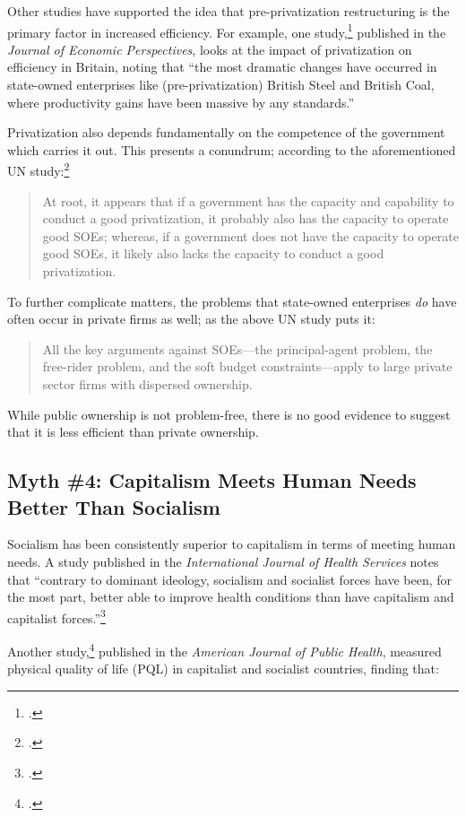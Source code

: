 Other studies have supported the idea that pre-privatization restructuring is the primary factor in increased efficiency.
For example, one study,\footcite{vickers-privatization} published in the \textit{Journal of Economic Perspectives}, looks at the impact of privatization on efficiency in Britain, noting that ``the most dramatic changes have occurred in state-owned enterprises like (pre-privatization) British Steel and British Coal, where productivity gains have been massive by any standards.''

Privatization also depends fundamentally on the competence of the government which carries it out.
This presents a conundrum; according to the aforementioned UN study:\footcite{ha-joon}
\begin{quote}
At root, it appears that if a government has the capacity and capability to conduct a good privatization, it probably also has the capacity to operate good SOEs; whereas, if a government does not have the capacity to operate good SOEs, it likely also lacks the capacity to conduct a good privatization.
\end{quote}
To further complicate matters, the problems that state-owned enterprises \emph{do} have often occur in private firms as well; as the above UN study puts it:
\begin{quote}
All the key arguments against SOEs---the principal-agent problem, the free-rider problem, and the soft budget constraints---apply to large private sector firms with dispersed ownership.
\end{quote}
While public ownership is not problem-free, there is no good evidence to suggest that it is less efficient than private ownership.

\subsection*{Myth \#4: Capitalism Meets Human Needs Better Than Socialism}

Socialism has been consistently superior to capitalism in terms of meeting human needs.
A study published in the \textit{International Journal of Health Services} notes that ``contrary to dominant ideology, socialism and socialist forces have been, for the most part, better able to improve health conditions than have capitalism and capitalist forces.''\footcite{navarro-socialism}

Another study,\footcite{cereseto-economic} published in the \textit{American Journal of Public Health}, measured physical quality of life (PQL) in capitalist and socialist countries, finding that:

